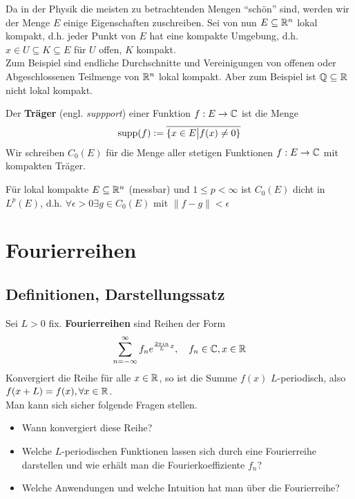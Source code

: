 Da in der Physik die meisten zu betrachtenden Mengen ``schön'' sind, werden wir der Menge $E$ einige Eigenschaften zuschreiben. Sei von nun $E \subseteq \mathbb{R}^n$ lokal kompakt, d.h. jeder Punkt von $E$ hat eine kompakte Umgebung, d.h. $x \in U \subseteq K \subseteq E$ für $U$ offen, $K$ kompakt.\\

Zum Beispiel sind endliche Durchschnitte und Vereinigungen von offenen oder Abgeschlossenen Teilmenge von $\mathbb{R}^n$ lokal kompakt. Aber zum Beispiel ist $\mathbb{Q} \subseteq \mathbb{R}$ nicht lokal kompakt.\\

\begin{definition}[]
	Der \textbf{Träger} (engl. \emph{suppport}) einer Funktion $f: E \to \mathbb{C}$ ist die Menge
\begin{align*}
				\operatorname{supp}(f) := \overline{\{x \in E \big\vert f(x) \neq 0\}}
\end{align*}
Wir schreiben $C_0(E)$ für die Menge aller stetigen Funktionen $f: E \to \mathbb{C}$ mit kompakten Träger.
\end{definition}


\begin{satz}[]
	Für lokal kompakte $E \subseteq \mathbb{R}^n$ (messbar) und $1 \leq p < \infty$ ist $C_0(E)$ dicht in $L^p(E)$, d.h. $\forall \epsilon > 0 \exists g \in  C_0(E)$ mit $\|f - g\| < \epsilon$
\end{satz}




\section{Fourierreihen}
\subsection{Definitionen, Darstellungssatz}

Sei $L > 0$ fix. \textbf{Fourierreihen} sind Reihen der Form
\begin{align*}
	 \sum_{n = - \infty}^{\infty} f_n e^{\frac{2\pi in}{L}x}, \quad f_n \in \mathbb{C}, x \in \mathbb{R}
\end{align*}
Konvergiert die Reihe für alle $x \in \mathbb{R}$, so ist die Summe $f(x)$ $L$-periodisch, also $f(x + L) = f(x), \forall x \in \mathbb{R}$.\\

Man kann sich sicher folgende Fragen stellen.
\begin{itemize}
\item Wann konvergiert diese Reihe?
\item Welche $L$-periodischen Funktionen lassen sich durch eine Fourierreihe darstellen und wie erhält man die Fourierkoeffiziente $f_n$?
\item Welche Anwendungen und welche Intuition hat man über die Fourierreihe?
\end{itemize}


